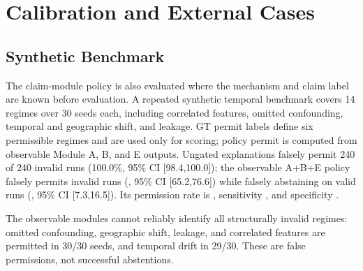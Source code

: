 \documentclass[conference]{IEEEtran}
\begin{document}
\section{Calibration and External Cases}
\subsection{Synthetic Benchmark}
The claim-module policy is also evaluated where the mechanism and claim label are
known before evaluation. A repeated synthetic temporal benchmark covers 14 regimes
over 30 seeds each, including correlated features, omitted confounding, temporal
and geographic shift, and leakage. GT permit labels define six permissible
regimes and are used only for scoring; policy permit is computed from observable
Module A, B, and E outputs. Ungated explanations falsely permit 240 of 240
invalid runs (100.0\%, 95\% CI [98.4,100.0]); the observable A+B+E policy falsely permits
\SyntheticPolicyFalsePermissions{} invalid runs (\SyntheticPolicyFalsePermissionRate{},
95\% CI [65.2,76.6]) while falsely abstaining on
\SyntheticPolicyFalseAbstentions{} valid runs
(\SyntheticPolicyFalseAbstentionRate{}, 95\% CI [7.3,16.5]). Its permission rate
is \SyntheticPolicyPermissionRate{}, sensitivity \SyntheticPolicySensitivity{},
and specificity \SyntheticPolicySpecificity{}.

\begin{table}[t]
\centering
\caption{Synthetic scenario-level calibration. GT permit is used only as the
evaluation label. Policy permission is computed solely from pre-specified
observable Modules A, B, and E; neither the GT label nor the hidden
data-generating mechanism is an input to the policy. A, B, E, and Policy report
pass or permission rates across 30 seeds for an event-recovery claim.}
\label{tab:synthetic}
\scriptsize

\end{table}
The observable modules cannot reliably identify all structurally invalid regimes:
omitted confounding, geographic shift, leakage, and correlated features are
permitted in 30/30 seeds, and temporal drift in 29/30. These are false
permissions, not successful abstentions.
\end{document}
